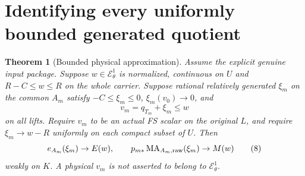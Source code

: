 \documentclass[11pt]{article}
\newtheorem{theorem}{Theorem}
\newcommand{\MA}{\operatorname{MA}}
\newcommand{\EE}{\mathcal E^1_\theta}
\begin{document}
\section{Identifying every uniformly bounded generated quotient}
\begin{theorem}[Bounded physical approximation]\label{bounded}
Assume the explicit genuine input package.
Suppose $w\in\EE$ is normalized, continuous on $U$ and
$R-C\leq w\leq R$ on the whole carrier.
Suppose rational relatively generated $\xi_m$ on the common
$A_m$ satisfy $-C\leq\xi_m\leq0$,
$\xi_m(v_0)\to0$, and
\[
 v_m=q_{T_m}+\xi_m\leq w
\]
on all lifts. Require $v_m$ to be an actual FS scalar on the
original $L$, and require
$\xi_m\to w-R$ uniformly on each compact subset of $U$.
Then
\[
 e_{A_m}(\xi_m)\to E(w),\qquad
 p_{m*}\MA_{A_m,\rm raw}(\xi_m)\to M(w)                 \tag{8}
\]
weakly on $K$. A physical $v_m$ is not asserted to belong to $\EE$.
\end{theorem}
\end{document}
